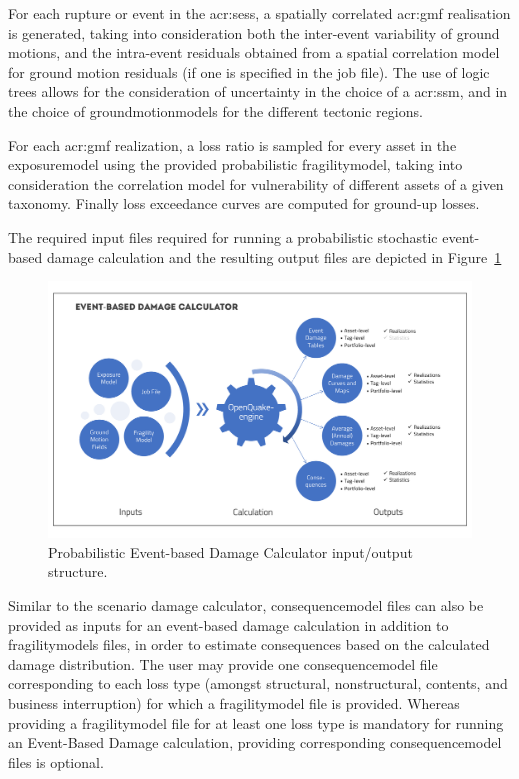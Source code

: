 For each \gls{rupture} or event in the \glspl{acr:ses}, a spatially correlated
\gls{acr:gmf} realisation is generated, taking into consideration both the
inter-event variability of ground motions, and the intra-event residuals
obtained from a spatial correlation model for ground motion residuals (if one 
is specified in the job file). The use of logic trees allows for the 
consideration of uncertainty in the choice of a \glsdesc{acr:ssm}, and in the 
choice of \glspl{groundmotionmodel} for the different tectonic regions.

For each \gls{acr:gmf} realization, a loss ratio is sampled for every
\gls{asset} in the \gls{exposuremodel} using the provided probabilistic
\gls{fragilitymodel}, taking into consideration the correlation model for
vulnerability of different \glspl{asset} of a given taxonomy. Finally loss
exceedance curves are computed for ground-up losses.

The required input files required for running a probabilistic stochastic
event-based damage calculation and the resulting output files are depicted in
Figure~\ref{fig:io-structure-event-based-damage}

\begin{figure}[ht]
\centering
\includegraphics[width=12cm]{figures/risk/io-structure-event-based-damage.pdf}
\caption{Probabilistic Event-based Damage Calculator input/output structure.}
\label{fig:io-structure-event-based-damage}
\end{figure}

Similar to the scenario damage calculator, \gls{consequencemodel} files can also be
provided as inputs for an event-based damage calculation in addition to
\glspl{fragilitymodel} files, in order to estimate consequences based on the
calculated damage distribution. The user may provide one
\gls{consequencemodel} file corresponding to each loss type (amongst
structural, nonstructural, contents, and business interruption) for which a
\gls{fragilitymodel} file is provided. Whereas providing a
\gls{fragilitymodel} file for at least one loss type is mandatory for running
an Event-Based Damage calculation, providing corresponding \gls{consequencemodel}
files is optional.
